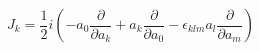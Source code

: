 \begin{equation}
J_k= \frac{1}{2} i(-a_0 \frac{\partial}{\partial a_k} + a_k \frac{\partial}{\partial a_0} - \epsilon_{klm} a_l \frac{\partial}{\partial a_m})
\end{equation}

